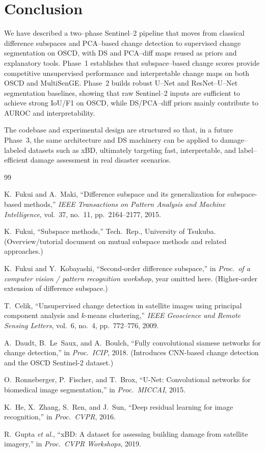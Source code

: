 \documentclass[twoside,11pt]{article}
\begin{document}
\section{Conclusion}

We have described a two--phase Sentinel--2 pipeline that moves from classical
difference subspaces and PCA--based change detection to supervised change
segmentation on OSCD, with DS and PCA--diff maps reused as priors and
explanatory tools. Phase~1 establishes that subspace--based change scores
provide competitive unsupervised performance and interpretable change maps
on both OSCD and MultiSenGE. Phase~2 builds robust U--Net and ResNet--U--Net
segmentation baselines, showing that raw Sentinel--2 inputs are sufficient to
achieve strong IoU/F1 on OSCD, while DS/PCA--diff priors mainly contribute to
AUROC and interpretability.

The codebase and experimental design are structured so that, in a future
Phase~3, the same architecture and DS machinery can be applied to
damage--labeled datasets such as xBD, ultimately targeting fast, interpretable,
and label--efficient damage assessment in real disaster scenarios.

\begin{thebibliography}{99}

K.~Fukui and A.~Maki, ``Difference subspace and its generalization for
subspace-based methods,'' \emph{IEEE Transactions on Pattern Analysis and
Machine Intelligence}, vol.~37, no.~11, pp.~2164--2177, 2015.

K.~Fukui, ``Subspace methods,'' Tech.\ Rep., University of Tsukuba.
(Overview/tutorial document on mutual subspace methods and related
approaches.)

K.~Fukui and Y.~Kobayashi, ``Second-order difference subspace,'' in
\emph{Proc.\ of a computer vision / pattern recognition workshop},
year omitted here. (Higher-order extension of difference subspace.)

T.~Celik, ``Unsupervised change detection in satellite images using principal
component analysis and $k$-means clustering,'' \emph{IEEE Geoscience and
Remote Sensing Letters}, vol.~6, no.~4, pp.~772--776, 2009.

A.~Daudt, B.~Le~Saux, and A.~Boulch, ``Fully convolutional siamese networks
for change detection,'' in \emph{Proc.\ ICIP}, 2018. (Introduces CNN-based
change detection and the OSCD Sentinel-2 dataset.)

O.~Ronneberger, P.~Fischer, and T.~Brox, ``U-Net: Convolutional networks for
biomedical image segmentation,'' in \emph{Proc.\ MICCAI}, 2015.

K.~He, X.~Zhang, S.~Ren, and J.~Sun, ``Deep residual learning for image
recognition,'' in \emph{Proc.\ CVPR}, 2016.

R.~Gupta \emph{et al.}, ``xBD: A dataset for assessing building damage from
satellite imagery,'' in \emph{Proc.\ CVPR Workshops}, 2019.

\end{thebibliography}
\end{document}
